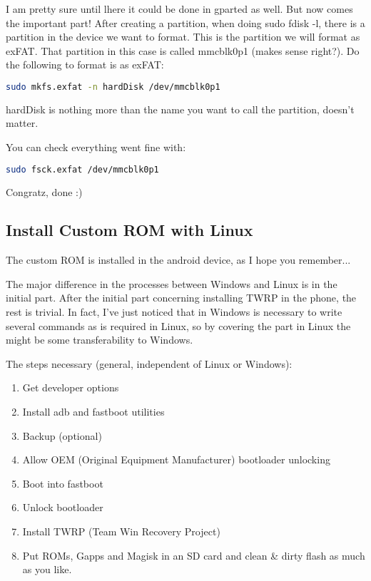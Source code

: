 \par I am pretty sure until lhere it could be done in gparted as well. But now comes the important part! After creating a partition, when doing sudo fdisk -l, there is a partition in the device we want to format. This is the partition we will format as exFAT. That partition in this case is called mmcblk0p1 (makes sense right?). Do the following to format is as exFAT:
\begin{lstlisting}[language=bash]
    sudo mkfs.exfat -n hardDisk /dev/mmcblk0p1
\end{lstlisting}

\par hardDisk is nothing more than the name you want to call the partition, doesn't matter.

\par You can check everything went fine with:
\begin{lstlisting}[language=bash]
    sudo fsck.exfat /dev/mmcblk0p1
\end{lstlisting}

\par Congratz, done :)




\subsection{Install Custom ROM with Linux}
\par The custom ROM is installed in the android device, as I hope you remember...


\par The major difference in the processes between Windows and Linux is in the initial part. After the initial part concerning installing TWRP in the phone, the rest is trivial. In fact, I've just noticed that in Windows is necessary to write several commands as is required in Linux, so by covering the part in Linux the might be some transferability to Windows.

\par The steps necessary (general, independent of Linux or Windows):

\begin{enumerate}
    \item Get developer options
    \item Install adb and fastboot utilities
    \item Backup (optional)
    \item Allow OEM (Original Equipment Manufacturer) bootloader unlocking
    \item Boot into fastboot
    \item Unlock bootloader
    \item Install TWRP (Team Win Recovery Project)
    \item Put ROMs, Gapps and Magisk in an SD card and clean \& dirty flash as much as you like.
\end{enumerate}


